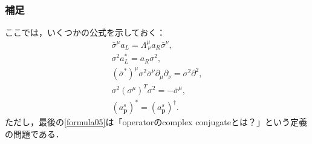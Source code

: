 \documentclass[pdflatex,unicode,ja=standard,12pt]{beamer}
\begin{document}
\begin{frame}[noframenumbering]

  \frametitle{補足\ \subsecname}
  \thispagestyle{empty}

  ここでは，いくつかの公式を示しておく：
  \begin{gather}
    \bar{\sigma}^{\mu}a_L
    =
    \Lambda^{\mu}_{\ \nu}a_R\bar{\sigma}^{\nu}
    ,
    \label{formula01}
    \\
    \sigma^2 a_L^{*}
    =
    a_R \sigma^2
    ,
    \label{formula02}
    \\    
    (\bar{\sigma}^{*})^{\mu}\sigma^2\bar{\sigma}^{\nu}
    \partial_\mu\partial_\nu
    =
    \sigma^2\partial^2
    ,
    \label{formula03}
    \\
    \sigma^2(\sigma^{\mu})^{T}\sigma^2
    =
    -\bar{\sigma}^{\mu}
    ,
    \label{formula04}
    \\
    (a_{\mathbf{p}}^s)^{*}
    =    
    (a_{\mathbf{p}}^s)^{\dag}
    .
    \label{formula05}
  \end{gather}
  ただし，最後の\eqref{formula05}は「operatorのcomplex conjugateとは？」という定義の問題である．

\end{frame}
\end{document}
